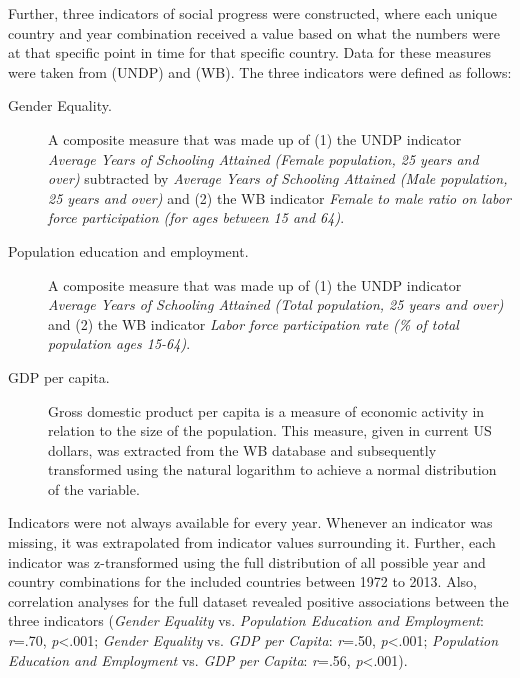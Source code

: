Further, three indicators of social progress were constructed, where each unique country and year combination received a value based on what the numbers were at that specific point in time for that specific country. Data for these measures were taken from \emph{\citeauthor{UNDP}} (UNDP) and \emph{\citeauthor{WB}} (WB). The three indicators were defined as follows:

\begin{description} \item [Gender Equality.] A composite measure that was made up of (1) the UNDP indicator \emph{Average Years of Schooling Attained (Female population, 25 years and over)} subtracted by \emph{Average Years of Schooling Attained (Male population, 25 years and over)} and (2) the WB indicator \emph{Female to male ratio on labor force participation (for ages between 15 and 64)}. \item [Population education and employment.] A composite measure that was made up of (1) the UNDP indicator \emph{Average Years of Schooling Attained (Total population, 25 years and over)} and (2) the WB indicator \emph{Labor force participation rate (\% of total population ages 15-64)}. \item [GDP per capita.] Gross domestic product per capita is a measure of economic activity in relation to the size of the population. This measure, given in current US dollars, was extracted from the WB database and subsequently transformed using the natural logarithm to achieve a normal distribution of the variable. \end{description}

Indicators were not always available for every year. Whenever an indicator was missing, it was extrapolated from indicator values surrounding it. Further, each indicator was z-transformed using the full distribution of all possible year and country combinations for the included countries between 1972 to 2013. Also, correlation analyses for the full dataset revealed positive associations between the three indicators (\emph{Gender Equality} vs. \emph{Population Education and Employment}: \emph{r}=.70, \emph{p}<.001; \emph{Gender Equality} vs. \emph{GDP per Capita}: \emph{r}=.50, \emph{p}<.001; \emph{Population Education and Employment} vs. \emph{GDP per Capita}: \emph{r}=.56, \emph{p}<.001).

